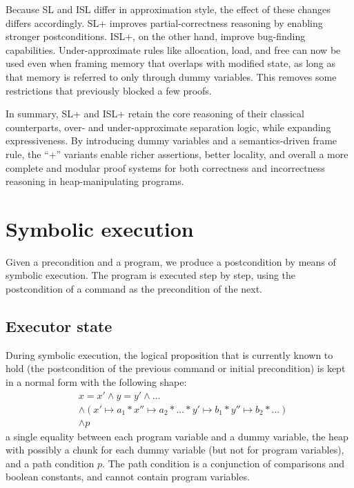 \documentclass[parskip=half]{scrartcl}
\begin{document}
Because SL and ISL differ in approximation style, the effect of these changes differs accordingly. SL+ improves partial-correctness reasoning by enabling stronger postconditions. ISL+, on the other hand, improve bug-finding capabilities. Under-approximate rules like allocation, load, and free can now be used even when framing memory that overlaps with modified state, as long as that memory is referred to only through dummy variables. This removes some restrictions that previously blocked a few proofs.

In summary, SL+ and ISL+ retain the core reasoning of their classical counterparts, over- and under-approximate separation logic, while expanding expressiveness. By introducing dummy variables and a semantics-driven frame rule, the ``+'' variants enable richer assertions, better locality, and overall a more complete and modular proof systems for both correctness and incorrectness reasoning in heap-manipulating programs.




\section{Symbolic execution}

Given a precondition and a program, we produce a postcondition by means of symbolic execution. The program is executed step by step, using the postcondition of a command as the precondition of the next.

\subsection{Executor state}

During symbolic execution, the logical proposition that is currently known to hold (\ie the postcondition of the previous command or initial precondition) is kept in a normal form with the following shape:
\begin{align*}
  &x = x' \wedge y = y' \wedge \dots \\
  &\wedge (x' \mapsto a_1 \ast x'' \mapsto a_2 \ast \dots \ast y' \mapsto b_1 \ast y'' \mapsto b_2 \ast \dots) \\
  &\wedge p
\end{align*}
\ie a single equality between each program variable and a dummy variable, the heap with possibly a chunk for each dummy variable (but not for program variables), and a path condition \(p\). The path condition is a conjunction of comparisons and boolean constants, and cannot contain program variables.
\end{document}
